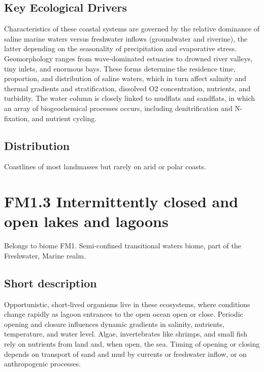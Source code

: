 \documentclass[
  letterpaper,
  DIV=11,
  numbers=noendperiod]{scrartcl}
\begin{document}
\subsection{Key Ecological Drivers}\label{key-ecological-drivers-132}

Characteristics of these coastal systems are governed by the relative
dominance of saline marine waters versus freshwater inflows (groundwater
and riverine), the latter depending on the seasonality of precipitation
and evaporative stress. Geomorphology ranges from wave-dominated
estuaries to drowned river valleys, tiny inlets, and enormous bays.
These forms determine the residence time, proportion, and distribution
of saline waters, which in turn affect salinity and thermal gradients
and stratification, dissolved O2 concentration, nutrients, and
turbidity. The water column is closely linked to mudflats and sandflats,
in which an array of biogeochemical processes occurs, including
denitrification and N-fixation, and nutrient cycling.

\subsection{Distribution}\label{distribution-132}

Coastlines of most landmasses but rarely on arid or polar coasts.

\section{FM1.3 Intermittently closed and open lakes and
lagoons}\label{fm1.3-intermittently-closed-and-open-lakes-and-lagoons-1}

Belongs to biome FM1. Semi-confined transitional waters biome, part of
the Freshwater, Marine realm.

\subsection{Short description}\label{short-description-133}

Opportunistic, short-lived organisms live in these ecosystems, where
conditions change rapidly as lagoon entrances to the open ocean open or
close. Periodic opening and closure influences dynamic gradients in
salinity, nutrients, temperature, and water level. Algae, invertebrates
like shrimps, and small fish rely on nutrients from land and, when open,
the sea. Timing of opening or closing depends on transport of sand and
mud by currents or freshwater inflow, or on anthropogenic processes.
\end{document}
